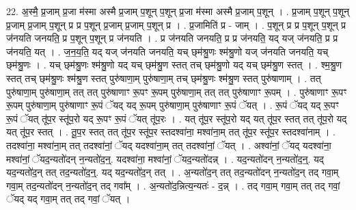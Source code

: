 \documentclass[17pt]{extarticle}
\begin{document}
22. अ॒स्मै॒ प्र॒जाम् प्र॒जा म॑स्मा अस्मै प्र॒जाम् प॒शून् प॒शून् प्र॒जा म॑स्मा अस्मै प्र॒जाम् प॒शून् । . प्र॒जाम् प॒शून् प॒शून् प्र॒जाम् प्र॒जाम् प॒शून् प्र प्र प॒शून् प्र॒जाम् प्र॒जाम् प॒शून् प्र । . प्र॒जामिति॑ प्र - जाम् । . प॒शून् प्र प्र प॒शून् प॒शून् प्र ज॑नयति जनयति॒ प्र प॒शून् प॒शून् प्र ज॑नयति । . प्र ज॑नयति जनयति॒ प्र प्र ज॑नयति॒ यद् यज् ज॑नयति॒ प्र प्र ज॑नयति॒ यत् । . ज॒न॒य॒ति॒ यद् यज् ज॑नयति जनयति॒ यच् छ्‌म॑श्रु॒णः श्म॑श्रु॒णो यज् ज॑नयति जनयति॒ यच् छ्‌म॑श्रु॒णः । . यच् छ्‌म॑श्रु॒णः श्म॑श्रु॒णो यद् यच् छ्‌म॑श्रु॒ण स्तत् तच् छ्‌म॑श्रु॒णो यद् यच् छ्‌म॑श्रु॒ण स्तत् । . श्म॒श्रु॒ण स्तत् तच् छ्‌म॑श्रु॒णः श्म॑श्रु॒ण स्तत् पुरु॑षाणा॒म् पुरु॑षाणा॒म् तच् छ्‌म॑श्रु॒णः श्म॑श्रु॒ण स्तत् पुरु॑षाणाम् । . तत् पुरु॑षाणा॒म् पुरु॑षाणा॒म् तत् तत् पुरु॑षाणाꣳ रू॒पꣳ रू॒पम् पुरु॑षाणा॒म् तत् तत् पुरु॑षाणाꣳ रू॒पम् । . पुरु॑षाणाꣳ रू॒पꣳ रू॒पम् पुरु॑षाणा॒म् पुरु॑षाणाꣳ रू॒पं ॅयद् यद् रू॒पम् पुरु॑षाणा॒म् पुरु॑षाणाꣳ रू॒पं ॅयत् । . रू॒पं ॅयद् यद् रू॒पꣳ रू॒पं ॅयत् तू॑प॒र स्तू॑प॒रो यद् रू॒पꣳ रू॒पं ॅयत् तू॑प॒रः । . यत् तू॑प॒र स्तू॑प॒रो यद् यत् तू॑प॒र स्तत् तत् तू॑प॒रो यद् यत् तू॑प॒र स्तत् । . तू॒प॒र स्तत् तत् तू॑प॒र स्तू॑प॒र स्तदश्वा॑ना॒ मश्वा॑ना॒म् तत् तू॑प॒र स्तू॑प॒र स्तदश्वा॑नाम् । . तदश्वा॑ना॒ मश्वा॑ना॒म् तत् तदश्वा॑नां॒ ॅयद् यदश्वा॑ना॒म् तत् तदश्वा॑नां॒ ॅयत् । . अश्वा॑नां॒ ॅयद् यदश्वा॑ना॒ मश्वा॑नां॒ ॅयद॒न्यतो॑दन् न॒न्यतो॑द॒न्॒. यदश्वा॑ना॒ मश्वा॑नां॒ ॅयद॒न्यतो॑दन्न् । . यद॒न्यतो॑दन् न॒न्यतो॑द॒न्॒. यद् यद॒न्यतो॑द॒न् तत् तद॒न्यतो॑द॒न्॒. यद् यद॒न्यतो॑द॒न् तत् । . अ॒न्यतो॑द॒न् तत् तद॒न्यतो॑दन् न॒न्यतो॑द॒न् तद् गवा॒म् गवा॒म् तद॒न्यतो॑दन् न॒न्यतो॑द॒न् तद् गवा᳚म् । . अ॒न्यतो॑द॒न्नित्य॒न्यतः॑ - द॒न्न् । . तद् गवा॒म् गवा॒म् तत् तद् गवां॒ ॅयद् यद् गवा॒म् तत् तद् गवां॒ ॅयत् । \newline
\end{document}
